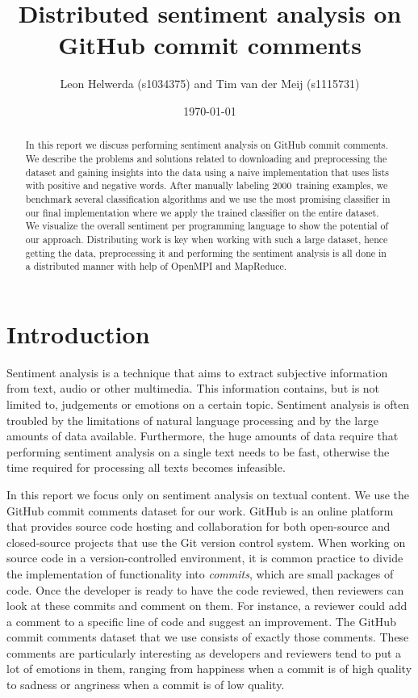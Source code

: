 \documentclass{article}
\begin{document}
\title{Distributed sentiment analysis on GitHub commit comments}
\author{Leon Helwerda (s1034375) and Tim van der Meij (s1115731)}
\date{\today}
\maketitle

\begin{abstract}
  In this report we discuss performing sentiment analysis on GitHub commit
  comments. We describe the problems and solutions related to downloading and
  preprocessing the dataset and gaining insights into the data using a naive
  implementation that uses lists with positive and negative words. After
  manually labeling 2000~training examples, we benchmark several classification
  algorithms and we use the most promising classifier in our final
  implementation where we apply the trained classifier on the entire dataset.
  We visualize the overall sentiment per programming language to show the
  potential of our approach. Distributing work is key when working with such a
  large dataset, hence getting the data, preprocessing it and performing the
  sentiment analysis is all done in a distributed manner with help of OpenMPI
  and MapReduce.
\end{abstract}

\section{Introduction}\label{sec:introduction}
Sentiment analysis is a technique that aims to extract subjective information
from text, audio or other multimedia. This information contains, but is not
limited to, judgements or emotions on a certain topic. Sentiment analysis is
often troubled by the limitations of natural language processing and by the
large amounts of data available. Furthermore, the huge amounts of data require
that performing sentiment analysis on a single text needs to be fast, otherwise
the time required for processing all texts becomes infeasible.

In this report we focus only on sentiment analysis on textual content. We use the
GitHub commit comments dataset for our work. GitHub is an online platform that
provides source code hosting and collaboration for both open-source and
closed-source projects that use the Git version control system. When working on
source code in a version-controlled environment, it is common practice to divide the
implementation of functionality into \emph{commits}, which are small packages of
code. Once the developer is ready to have the code reviewed, then reviewers can
look at these commits and comment on them. For instance, a reviewer could add a
comment to a specific line of code and suggest an improvement. The GitHub commit
comments dataset that we use consists of exactly those comments. These comments
are particularly interesting as developers and reviewers tend to put a lot of
emotions in them, ranging from happiness when a commit is of high quality to
sadness or angriness when a commit is of low quality.
\end{document}
